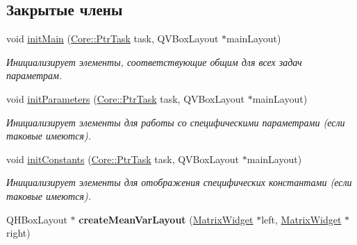 \subsection*{Закрытые члены}
\begin{DoxyCompactItemize}
\item 
\hypertarget{class_task_parameters_widget_ae35d8d16a02797220c4cd9f2b0ead18a}{}\label{class_task_parameters_widget_ae35d8d16a02797220c4cd9f2b0ead18a} 
void \hyperlink{class_task_parameters_widget_ae35d8d16a02797220c4cd9f2b0ead18a}{init\+Main} (\hyperlink{namespace_core_abfda8f69fcacfcea2696549b548ed737}{Core\+::\+Ptr\+Task} task, Q\+V\+Box\+Layout $\ast$main\+Layout)
\begin{DoxyCompactList}\small\item\em Инициализирует элементы, соответствующие общим для всех задач параметрам. \end{DoxyCompactList}\item 
\hypertarget{class_task_parameters_widget_ab88a1f7ceb86323733ee0e6b9b37d1f7}{}\label{class_task_parameters_widget_ab88a1f7ceb86323733ee0e6b9b37d1f7} 
void \hyperlink{class_task_parameters_widget_ab88a1f7ceb86323733ee0e6b9b37d1f7}{init\+Parameters} (\hyperlink{namespace_core_abfda8f69fcacfcea2696549b548ed737}{Core\+::\+Ptr\+Task} task, Q\+V\+Box\+Layout $\ast$main\+Layout)
\begin{DoxyCompactList}\small\item\em Инициализирует элементы для работы со специфическими параметрами (если таковые имеются). \end{DoxyCompactList}\item 
\hypertarget{class_task_parameters_widget_a69fbd1302d74e2e8eef29fb333c18432}{}\label{class_task_parameters_widget_a69fbd1302d74e2e8eef29fb333c18432} 
void \hyperlink{class_task_parameters_widget_a69fbd1302d74e2e8eef29fb333c18432}{init\+Constants} (\hyperlink{namespace_core_abfda8f69fcacfcea2696549b548ed737}{Core\+::\+Ptr\+Task} task, Q\+V\+Box\+Layout $\ast$main\+Layout)
\begin{DoxyCompactList}\small\item\em Инициализирует элементы для отображения специфических константами (если таковые имеются). \end{DoxyCompactList}\item 
\hypertarget{class_task_parameters_widget_aaef0cd523b0a6e78b223d27f0b2de268}{}\label{class_task_parameters_widget_aaef0cd523b0a6e78b223d27f0b2de268} 
Q\+H\+Box\+Layout $\ast$ {\bfseries create\+Mean\+Var\+Layout} (\hyperlink{class_matrix_widget}{Matrix\+Widget} $\ast$left, \hyperlink{class_matrix_widget}{Matrix\+Widget} $\ast$right)
\end{DoxyCompactItemize}

